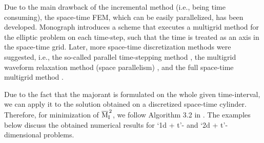 \vskip 10pt

Due to the main drawback of the incremental method  (i.e., being time consuming), 
the space-time FEM, which can be easily parallelized, has been developed. Monograph 
\cite{Hackbusch1984} introduces a scheme that executes a multigrid method for the  elliptic 
problem on each time-step, such that the time is treated as an axis in the space-time 
grid. Later, more space-time discretization methods were suggested, i.e., 
the so-called parallel time-stepping method \cite{Womble1990}, the multigrid waveform 
relaxation method (space parallelism) \cite{VandewallePiessens1992}, and the full 
space-time multigrid method \cite{HortonVandewalle1995}. 

Due to the fact that the majorant is formulated on the whole given time-interval, 
we can apply 
it to the solution obtained on a discretized space-time cylinder. Therefore, 
for minimization of $\overline{\mathrm M}^{\,2}_{\mathrm{I}}$, we follow Algorithm 3.2 in 
\cite[Section 3.3.1]{Malietall2014}. The examples below discuss the obtained numerical 
results for \linebreak `1d + t'- and `2d + t'-dimensional problems.

